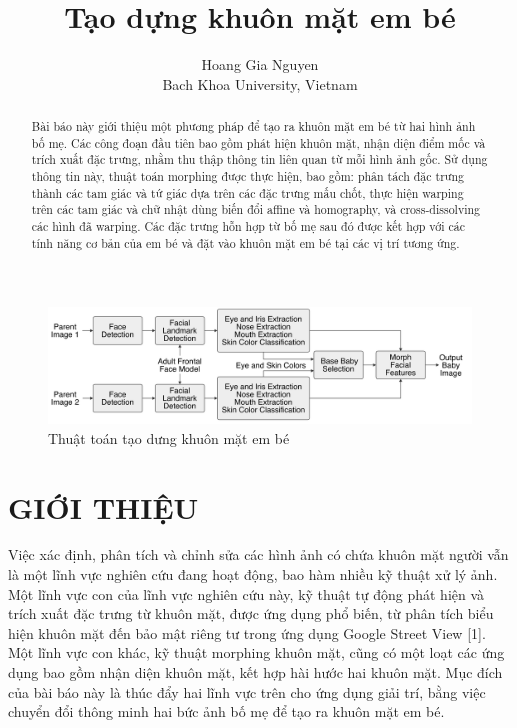 \documentclass[journal]{IEEEtran}
\begin{document}
\title{Tạo dựng khuôn mặt em bé}
\author{Hoang Gia Nguyen\\
Bach Khoa University, Vietnam\\}

\maketitle

\begin{center}
    \begin{figure}[htp]
    \begin{center}
     \includegraphics[scale=1]{Images/44}
    \end{center}
    \caption{Thuật toán tạo dưng khuôn mặt em bé}
    \label{refhinh1}
    \end{figure}
\end{center}

\begin{abstract}

Bài báo này giới thiệu một phương pháp để tạo ra khuôn mặt em bé từ hai hình ảnh bố mẹ. Các công đoạn đầu tiên bao gồm phát hiện khuôn mặt, nhận diện điểm mốc và trích xuất đặc trưng, nhằm thu thập thông tin liên quan từ mỗi hình ảnh gốc. Sử dụng thông tin này, thuật toán morphing được thực hiện, bao gồm: phân tách đặc trưng thành các tam giác và tứ giác dựa trên các đặc trưng mấu chốt, thực hiện warping trên các tam giác và chữ nhật dùng biến đổi affine và homography, và cross-dissolving các hình đã warping. Các đặc trưng hỗn hợp từ bố mẹ sau đó được kết hợp với các tính năng cơ bản của em bé và đặt vào khuôn mặt em bé tại các vị trí tương ứng.

\end{abstract}

\IEEEpeerreviewmaketitle

\section{GIỚI THIỆU}

Việc xác định, phân tích và chỉnh sửa các hình ảnh có chứa khuôn mặt người vẫn là một lĩnh vực nghiên cứu đang hoạt động, bao hàm nhiều kỹ thuật xử lý ảnh. Một lĩnh vực con của lĩnh vực nghiên cứu này, kỹ thuật tự động phát hiện và trích xuất đặc trưng từ khuôn mặt, được ứng dụng phổ biến, từ phân tích biểu hiện khuôn mặt đến bảo mật riêng tư trong ứng dụng Google Street View [1]. Một lĩnh vực con khác, kỹ thuật morphing khuôn mặt, cũng có một loạt các ứng dụng bao gồm nhận diện khuôn mặt, kết hợp hài hước hai khuôn mặt. Mục đích của bài báo này là thúc đẩy hai lĩnh vực trên cho ứng dụng giải trí, bằng việc chuyển đổi thông minh hai bức ảnh bố mẹ để tạo ra khuôn mặt em bé.
\end{document}
